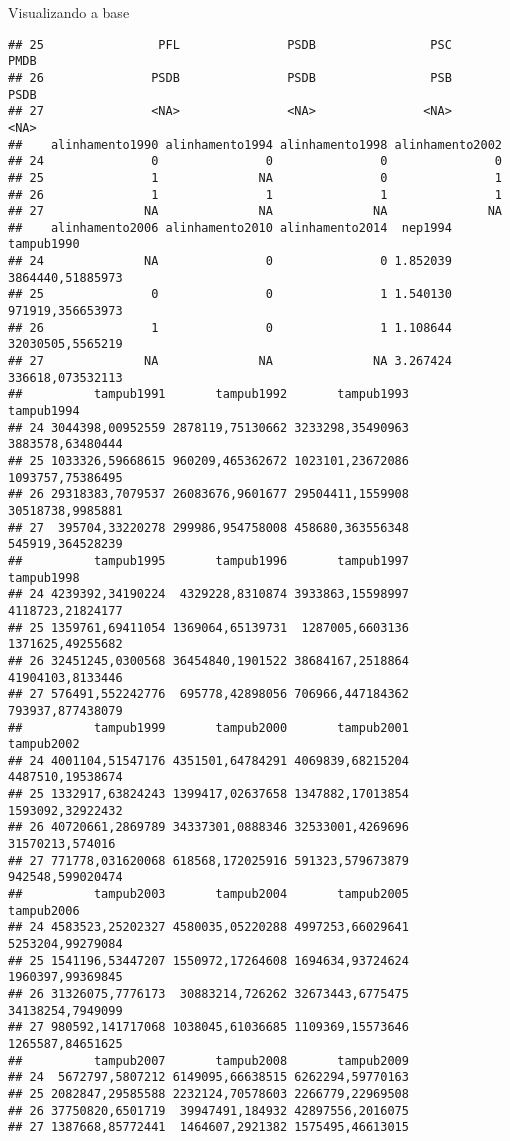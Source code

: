 \documentclass[
  10pt,
  ignorenonframetext,
]{beamer}
\begin{document}
\begin{frame}[fragile]{Visualizando a base}
\begin{verbatim}
## 25                PFL               PSDB                PSC               PMDB
## 26               PSDB               PSDB                PSB               PSDB
## 27               <NA>               <NA>               <NA>               <NA>
##    alinhamento1990 alinhamento1994 alinhamento1998 alinhamento2002
## 24               0               0               0               0
## 25               1              NA               0               1
## 26               1               1               1               1
## 27              NA              NA              NA              NA
##    alinhamento2006 alinhamento2010 alinhamento2014  nep1994       tampub1990
## 24              NA               0               0 1.852039 3864440,51885973
## 25               0               0               1 1.540130 971919,356653973
## 26               1               0               1 1.108644 32030505,5565219
## 27              NA              NA              NA 3.267424 336618,073532113
##          tampub1991       tampub1992       tampub1993       tampub1994
## 24 3044398,00952559 2878119,75130662 3233298,35490963 3883578,63480444
## 25 1033326,59668615 960209,465362672 1023101,23672086 1093757,75386495
## 26 29318383,7079537 26083676,9601677 29504411,1559908 30518738,9985881
## 27  395704,33220278 299986,954758008 458680,363556348 545919,364528239
##          tampub1995       tampub1996       tampub1997       tampub1998
## 24 4239392,34190224  4329228,8310874 3933863,15598997 4118723,21824177
## 25 1359761,69411054 1369064,65139731  1287005,6603136 1371625,49255682
## 26 32451245,0300568 36454840,1901522 38684167,2518864 41904103,8133446
## 27 576491,552242776  695778,42898056 706966,447184362 793937,877438079
##          tampub1999       tampub2000       tampub2001       tampub2002
## 24 4001104,51547176 4351501,64784291 4069839,68215204 4487510,19538674
## 25 1332917,63824243 1399417,02637658 1347882,17013854 1593092,32922432
## 26 40720661,2869789 34337301,0888346 32533001,4269696  31570213,574016
## 27 771778,031620068 618568,172025916 591323,579673879 942548,599020474
##          tampub2003       tampub2004       tampub2005       tampub2006
## 24 4583523,25202327 4580035,05220288 4997253,66029641 5253204,99279084
## 25 1541196,53447207 1550972,17264608 1694634,93724624 1960397,99369845
## 26 31326075,7776173  30883214,726262 32673443,6775475 34138254,7949099
## 27 980592,141717068 1038045,61036685 1109369,15573646 1265587,84651625
##          tampub2007       tampub2008       tampub2009
## 24  5672797,5807212 6149095,66638515 6262294,59770163
## 25 2082847,29585588 2232124,70578603 2266779,22969508
## 26 37750820,6501719  39947491,184932 42897556,2016075
## 27 1387668,85772441  1464607,2921382 1575495,46613015
\end{verbatim}
\end{frame}
\end{document}
